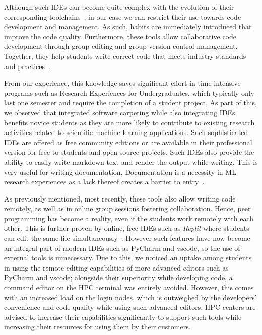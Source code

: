 Although such IDEs can become quite complex with the evolution of their corresponding toolchains~\cite{fincher_robins_2019}, in our case we can restrict their use towards code development and management.
As such, habits are immediately introduced that improve the code quality. Furthermore, these tools allow 
collaborative code development through group editing and group version control management.
Together, they help students write correct code that meets industry standards and practices~\cite{tan_chen}.

From our experience, this knowledge saves significant effort in time-intensive programs such as Research Experiences for Undergraduates, which typically only last one semester and require the completion of a student project. As part of this, we observed that integrated software carpeting while also integrating IDEs benefits novice students as they are more likely to contribute to existing research activities related to scientific machine learning applications.
Such sophisticated IDEs are offered as free community editions or are available in their professional version for free to students and open-source projects.
Such IDEs also provide the ability to easily write markdown text and render the output while writing. This is very useful for writing documentation. Documentation is a necessity in ML research experiences as a lack thereof creates a barrier to entry~\cite{konigstorfer}.

As previously mentioned, most recently, these tools also allow writing code remotely, as well as in online group sessions fostering collaboration. Hence, peer programming has become a reality, even if the students work remotely with each other. This is further proven by online, free IDEs such as {\em Replit} where students can edit the same file simultaneously~\cite{Kovtaniuk2022}. However such features have now become an integral part of modern IDEs such as PyCharm and vscode, so the use of external tools is unnecessary. Due to this, 
we noticed an uptake among students in using the remote editing capabilities of more advanced editors such as PyCharm and vscode; alongside their superiority while developing code, a command editor on the HPC terminal was entirely avoided. However, this comes with an increased load on the login nodes, which is outweighed by the developers' convenience and code quality while using such advanced editors. HPC centers are advised to increase their capabilities significantly to support such tools while increasing their resources for using them by their customers.

